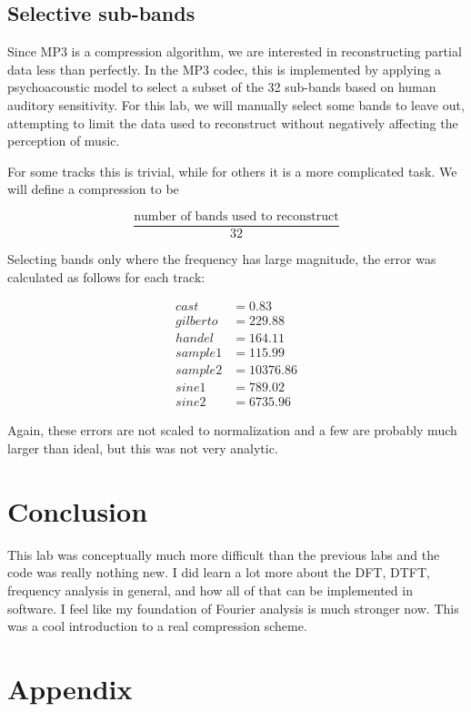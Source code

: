 \documentclass[11pt,a4paper]{article}
\begin{document}
\subsection{Selective sub-bands}
Since MP3 is a compression algorithm, we are interested in reconstructing partial data less than perfectly. In the MP3 codec, this is implemented by applying a psychoacoustic model to select a subset of the 32 sub-bands based on human auditory sensitivity. For this lab, we will manually select some bands to leave out, attempting to limit the data used to reconstruct without negatively affecting the perception of music.

For some tracks this is trivial, while for others it is a more complicated task. We will define a compression to be

\begin{equation}
\frac{\text{number of bands used to reconstruct}}{32}
\end{equation}

Selecting bands only where the frequency has large magnitude, the error was calculated as follows for each track:

\begin{align*}
cast &= 0.83 \\
gilberto &= 229.88 \\
handel &= 164.11 \\
sample1 &= 115.99 \\
sample2 &= 10376.86 \\
sine1 &= 789.02 \\
sine2 &= 6735.96
\end{align*}

Again, these errors are not scaled to normalization and a few are probably much larger than ideal, but this was not very analytic.

\section{Conclusion}
This lab was conceptually much more difficult than the previous labs and the code was really nothing new. I did learn a lot more about the DFT, DTFT, frequency analysis in general, and how all of that can be implemented in software. I feel like my foundation of Fourier analysis is much stronger now. This was a cool introduction to a real compression scheme.

\pagebreak

\section{Appendix}
\end{document}

